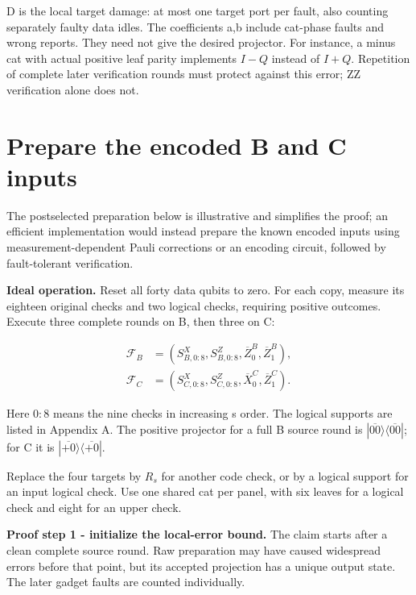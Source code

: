 \documentclass[11pt]{article}
\begin{document}
D is the local target damage: at most one target port per fault, also counting separately faulty data idles. The coefficients a,b include cat-phase faults and wrong reports. They need not give the desired projector. For instance, a minus cat with actual positive leaf parity implements \(I-Q\) instead of \(I+Q\). Repetition of complete later verification rounds must protect against this error; ZZ verification alone does not.

\section{Prepare the encoded B and C inputs}
The postselected preparation below is illustrative and simplifies the proof; an efficient implementation would instead prepare the known encoded inputs using measurement-dependent Pauli corrections or an encoding circuit, followed by fault-tolerant verification.

\textbf{Ideal operation.} Reset all forty data qubits to zero. For each copy, measure its eighteen original checks and two logical checks, requiring positive outcomes. Execute three complete rounds on B, then three on C:

\[
\begin{aligned}
\mathcal F_B&=(S^X_{B,0:8},S^Z_{B,0:8},\overline Z^B_0,\overline Z^B_1),\\
\mathcal F_C&=(S^X_{C,0:8},S^Z_{C,0:8},\overline X^C_0,\overline Z^C_1).
\end{aligned}
\]

Here \(0{:}8\) means the nine checks in increasing s order. The logical supports are listed in Appendix A. The positive projector for a full B source round is \(|\overline{00}\rangle\langle\overline{00}|\); for C it is \(|\overline{+0}\rangle\langle\overline{+0}|\).

\begin{center}\begin{minipage}{\linewidth}

\end{minipage}\end{center}

Replace the four targets by \(R_s\) for another code check, or by a logical support for an input logical check. Use one shared cat per panel, with six leaves for a logical check and eight for an upper check.

\textbf{Proof step 1 - initialize the local-error bound.} The claim starts after a clean complete source round. Raw preparation may have caused widespread errors before that point, but its accepted projection has a unique output state. The later gadget faults are counted individually.
\end{document}
